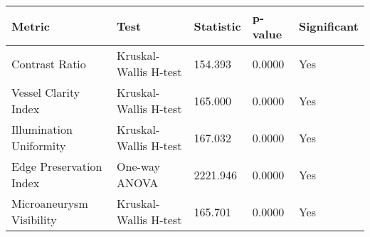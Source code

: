 \begin{tabular}{lllll}
\toprule
Metric & Test & Statistic & p-value & Significant \\
\midrule
Contrast Ratio & Kruskal-Wallis H-test & 154.393 & 0.0000 & Yes \\
Vessel Clarity Index & Kruskal-Wallis H-test & 165.000 & 0.0000 & Yes \\
Illumination Uniformity & Kruskal-Wallis H-test & 167.032 & 0.0000 & Yes \\
Edge Preservation Index & One-way ANOVA & 2221.946 & 0.0000 & Yes \\
Microaneurysm Visibility & Kruskal-Wallis H-test & 165.701 & 0.0000 & Yes \\
\bottomrule
\end{tabular}
